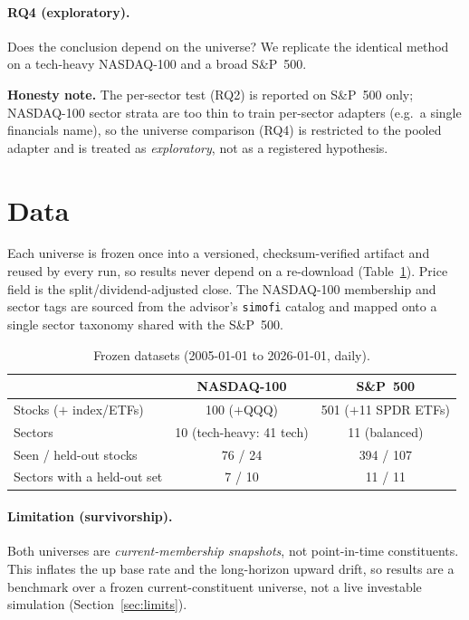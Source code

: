 \documentclass[11pt]{article}
\begin{document}
\paragraph{RQ4 (exploratory).} Does the conclusion depend on the universe? We
replicate the identical method on a tech-heavy NASDAQ-100 and a broad S\&P~500.

\noindent\textbf{Honesty note.} The per-sector test (RQ2) is reported on S\&P~500
only; NASDAQ-100 sector strata are too thin to train per-sector adapters (e.g.\ a
single financials name), so the universe comparison (RQ4) is restricted to the pooled
adapter and is treated as \emph{exploratory}, not as a registered hypothesis.

\section{Data}

Each universe is frozen once into a versioned, checksum-verified artifact and reused
by every run, so results never depend on a re-download (Table~\ref{tab:data}). Price
field is the split/dividend-adjusted close. The NASDAQ-100 membership and sector tags
are sourced from the advisor's \texttt{simofi} catalog and mapped onto a single sector
taxonomy shared with the S\&P~500.

\begin{table}[H]
\centering
\caption{Frozen datasets (2005-01-01 to 2026-01-01, daily).}
\label{tab:data}
\begin{tabular}{lcc}
\toprule
 & NASDAQ-100 & S\&P~500 \\
\midrule
Stocks ($+$ index/ETFs) & 100 ($+$QQQ) & 501 ($+$11 SPDR ETFs) \\
Sectors & 10 (tech-heavy: 41 tech) & 11 (balanced) \\
Seen / held-out stocks & 76 / 24 & 394 / 107 \\
Sectors with a held-out set & 7 / 10 & 11 / 11 \\
\bottomrule
\end{tabular}
\end{table}

\paragraph{Limitation (survivorship).} Both universes are \emph{current-membership
snapshots}, not point-in-time constituents. This inflates the up base rate and the
long-horizon upward drift, so results are a benchmark over a frozen current-constituent
universe, not a live investable simulation (Section~\ref{sec:limits}).
\end{document}
